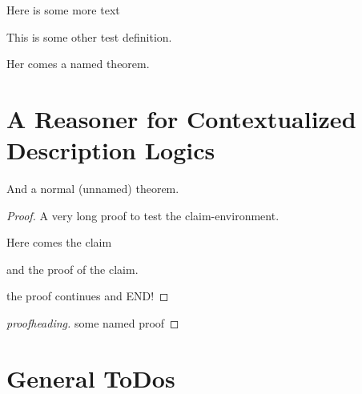 Here is some more text

\begin{definition}
  This is some other test definition.
\end{definition}

\begin{theorem*}[thmtitel]
  Her comes a named theorem.
\end{theorem*}

\section{A Reasoner for Contextualized Description Logics}
\label{sec:intro-reasoner}


\blindtext

\begin{theorem}
  And a normal (unnamed) theorem.
\end{theorem}


\begin{proof}
  A very long proof to test the claim-environment.

  \blindtext

  \begin{claim}
    Here comes the claim
  \end{claim}

  \begin{claimproof}{}
    and the proof of the claim.
  \end{claimproof}
  
  the proof continues
  \blindtext
  and END!
\end{proof}

\blindtext

\begin{proof}[proofheading]
 some named proof 
\end{proof}


\clearpage

\section{General ToDos}
\label{sec:todos}





